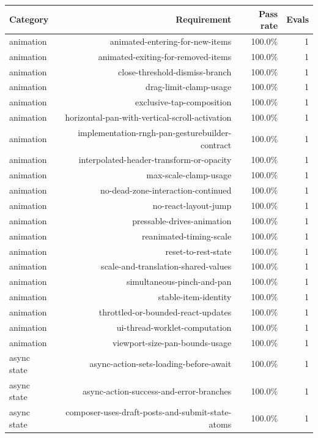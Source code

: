 \begin{table}[htbp]
\centering
\begin{tabular}{lrrr}
\toprule
Category & Requirement & Pass rate & Evals \\
\midrule
animation & animated-entering-for-new-items & 100.0\% & 1 \\
animation & animated-exiting-for-removed-items & 100.0\% & 1 \\
animation & close-threshold-dismiss-branch & 100.0\% & 1 \\
animation & drag-limit-clamp-usage & 100.0\% & 1 \\
animation & exclusive-tap-composition & 100.0\% & 1 \\
animation & horizontal-pan-with-vertical-scroll-activation & 100.0\% & 1 \\
animation & implementation-rngh-pan-gesturebuilder-contract & 100.0\% & 1 \\
animation & interpolated-header-transform-or-opacity & 100.0\% & 1 \\
animation & max-scale-clamp-usage & 100.0\% & 1 \\
animation & no-dead-zone-interaction-continued & 100.0\% & 1 \\
animation & no-react-layout-jump & 100.0\% & 1 \\
animation & pressable-drives-animation & 100.0\% & 1 \\
animation & reanimated-timing-scale & 100.0\% & 1 \\
animation & reset-to-rest-state & 100.0\% & 1 \\
animation & scale-and-translation-shared-values & 100.0\% & 1 \\
animation & simultaneous-pinch-and-pan & 100.0\% & 1 \\
animation & stable-item-identity & 100.0\% & 1 \\
animation & throttled-or-bounded-react-updates & 100.0\% & 1 \\
animation & ui-thread-worklet-computation & 100.0\% & 1 \\
animation & viewport-size-pan-bounds-usage & 100.0\% & 1 \\
async state & async-action-sets-loading-before-await & 100.0\% & 1 \\
async state & async-action-success-and-error-branches & 100.0\% & 1 \\
async state & composer-uses-draft-posts-and-submit-state-atoms & 100.0\% & 1 \\

\end{tabular}
\end{table}
